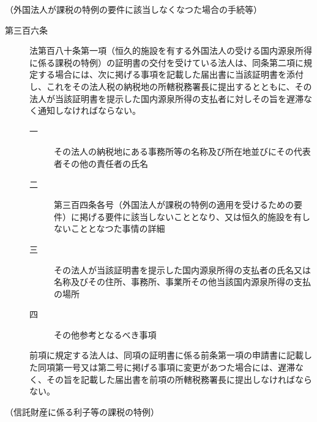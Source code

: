 \documentclass[twocolumn,a4j,10pt]{ltjtarticle}
\begin{document}
\noindent\hspace{10pt}（外国法人が課税の特例の要件に該当しなくなつた場合の手続等）
\begin{description}
\item[第三百六条]法第百八十条第一項（恒久的施設を有する外国法人の受ける国内源泉所得に係る課税の特例）の証明書の交付を受けている法人は、同条第二項に規定する場合には、次に掲げる事項を記載した届出書に当該証明書を添付し、これをその法人税の納税地の所轄税務署長に提出するとともに、その法人が当該証明書を提示した国内源泉所得の支払者に対しその旨を遅滞なく通知しなければならない。
\begin{description}
\item[一]その法人の納税地にある事務所等の名称及び所在地並びにその代表者その他の責任者の氏名
\item[二]第三百四条各号（外国法人が課税の特例の適用を受けるための要件）に掲げる要件に該当しないこととなり、又は恒久的施設を有しないこととなつた事情の詳細
\item[三]その法人が当該証明書を提示した国内源泉所得の支払者の氏名又は名称及びその住所、事務所、事業所その他当該国内源泉所得の支払の場所
\item[四]その他参考となるべき事項
\end{description}
\item[]前項に規定する法人は、同項の証明書に係る前条第一項の申請書に記載した同項第一号又は第二号に掲げる事項に変更があつた場合には、遅滞なく、その旨を記載した届出書を前項の所轄税務署長に提出しなければならない。
\end{description}
\noindent\hspace{10pt}（信託財産に係る利子等の課税の特例）
\end{document}
